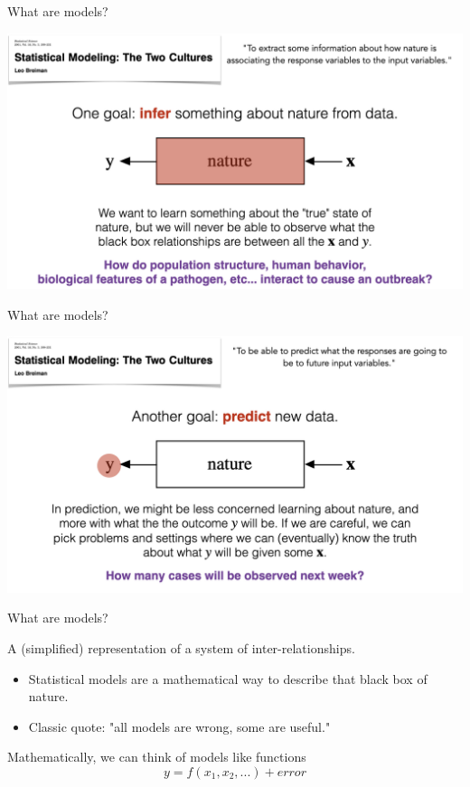 \documentclass[table]{beamer}\usepackage[]{graphicx}\usepackage[]{color}
\begin{document}
\begin{frame}{What are models?}

\includegraphics[width=\textwidth]{figure-static/models2.jpeg}

\end{frame}

\begin{frame}{What are models?}

\includegraphics[width=\textwidth]{figure-static/models3.jpeg}

\end{frame}




\begin{frame}{What are models?}


\begin{block}{A (simplified) representation of a system of inter-relationships.}

\begin{itemize}
	\item Statistical models are a mathematical way to describe that black box of nature.
	\item Classic quote: "all models are wrong, some are useful."
\end{itemize}

\end{block}

Mathematically, we can think of models like functions
$$ y = f(x_1, x_2, ...) + error $$


\end{frame}
\end{document}
